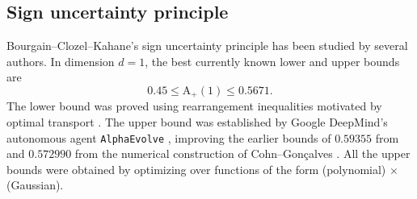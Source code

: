 \documentclass[10pt,reqno]{amsproc}
\newcommand{\rA}{\mathrm{A}}
\newcommand{\1}{\mathds{1}}	%
\theoremstyle{definition}
\theoremstyle{remark}
\begin{document}
\subsection{Sign uncertainty principle}

Bourgain--Clozel--Kahane's sign uncertainty principle has been studied by several authors.
In dimension $d=1$, the best currently known lower and upper bounds are
\[
0.45 \le \rA_+(1) \le 0.5671.
\]
The lower bound was proved using rearrangement inequalities motivated by optimal transport \cite[Theorem 1]{gonccalves2017hermite}.
The upper bound was established by Google DeepMind's autonomous agent \texttt{AlphaEvolve} \cite[Appendix B.4]{alphaevolve}, improving the earlier bounds of $0.59355$ from \cite[Theorem 1]{gonccalves2017hermite} and $0.572990$ from the numerical construction of Cohn--Gon{\c{c}}alves \cite[Table 2]{cohn2019optimal}.
All the upper bounds were obtained by optimizing over functions of the form (polynomial) $\times$ (Gaussian).
\end{document}
